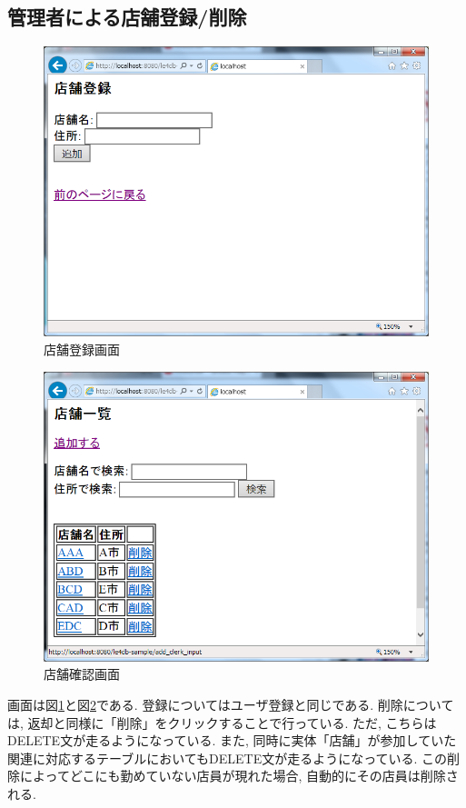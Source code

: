 \documentclass{jarticle}
\begin{document}
\subsection{管理者による店舗登録/削除}
\begin{figure}[tp]
\begin{center}
\includegraphics[scale=0.5]{add_shop.png}
\end{center}
\caption{店舗登録画面}
\label{fig:add_shop}
\end{figure}
\begin{figure}[tp]
\begin{center}
\includegraphics[scale=0.5]{delete_shop.png}
\end{center}
\caption{店舗確認画面}
\label{fig:delete_shop}
\end{figure}
画面は図\ref{fig:add_shop}と図\ref{fig:delete_shop}である. 登録についてはユーザ登録と同じである. 削除については, 返却と同様に「削除」をクリックすることで行っている. ただ, こちらはDELETE文が走るようになっている. また, 同時に実体「店舗」が参加していた関連に対応するテーブルにおいてもDELETE文が走るようになっている. この削除によってどこにも勤めていない店員が現れた場合, 自動的にその店員は削除される.
\end{document}
